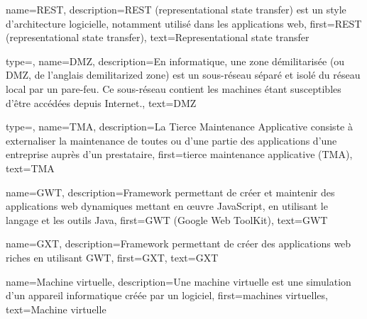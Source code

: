 





{
    name={REST},
    description={REST (representational state transfer) est un style d'architecture logicielle, notamment utilisé dans les applications web\cite{wiki:REST}},
    first={REST (representational state transfer)},
    text={Representational state transfer}
}

{
    type=\acronymtype,
    name={DMZ},
    description={En informatique, une zone démilitarisée (ou DMZ, de l'anglais demilitarized zone) est un sous-réseau séparé et isolé du réseau local par un pare-feu. Ce sous-réseau contient les machines étant susceptibles d'être accédées depuis Internet.\cite{wiki:DMZ}},
    text={DMZ}
}

{
    type=\acronymtype,
    name={TMA},
    description={La Tierce Maintenance Applicative consiste à externaliser la maintenance de toutes ou d'une partie des applications d'une entreprise auprès d'un prestataire},
    first={tierce maintenance applicative (TMA)},
    text={TMA}
}

{
    name={GWT},
    description={Framework permettant de créer et maintenir des applications web dynamiques mettant en œuvre JavaScript, en utilisant le langage et les outils Java},
    first={GWT (Google Web ToolKit)},
    text={GWT}
}

{
    name={GXT},
    description={Framework permettant de créer des applications web riches en utilisant GWT},
    first={GXT},
    text={GXT}
}

{
    name={Machine virtuelle},
    description={Une machine virtuelle est une simulation d'un appareil informatique créée par un logiciel},
    first={machines virtuelles},
    text={Machine virtuelle}
}

